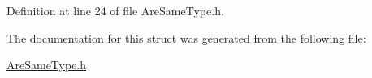Definition at line 24 of file Are\+Same\+Type.\+h.



The documentation for this struct was generated from the following file\+:\begin{DoxyCompactItemize}
\item 
\hyperlink{_are_same_type_8h}{Are\+Same\+Type.\+h}\end{DoxyCompactItemize}
